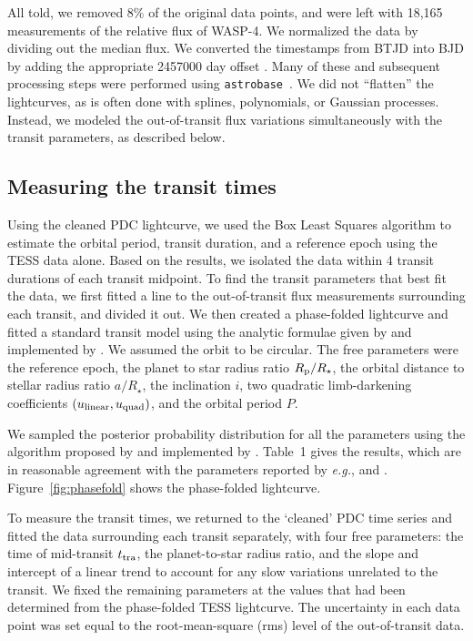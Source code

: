 \documentclass[12pt,twocolumn,tighten]{aastex62}
\begin{document}
All told, we removed 8\% of the original data points, and were left
with 18{,}165 measurements of the relative flux of WASP-4.  We
normalized the data by dividing out the median flux.  We converted the
timestamps from BTJD into BJD by adding the appropriate 2457000 day
offset \citep{tess_data_product_description_2018}.  Many of these and
subsequent processing steps were performed using
\texttt{astrobase}~\citep{bhatti_astrobase_2018}. We did not
``flatten'' the lightcurves, as is often done with splines,
polynomials, or Gaussian processes.  Instead, we modeled the
out-of-transit flux variations simultaneously with the transit parameters,
as described below.

\subsection{Measuring the transit times}
\label{sec:measurement}

Using the cleaned PDC lightcurve, we used the Box Least Squares
algorithm \citep{kovacs_box-fitting_2002} to estimate the orbital
period, transit duration, and a reference epoch using the TESS data
alone.  Based on the results, we isolated the data within 4 transit
durations of each transit midpoint.  To find the transit parameters
that best fit the data, we first fitted a line to the out-of-transit
flux measurements surrounding each transit, and divided it out.  We
then created a phase-folded lightcurve and fitted a standard transit
model using the analytic formulae given by
\citet{mandel_analytic_2002} and implemented by
\citet{kreidberg_batman_2015}.  We assumed the orbit to be circular.
The free parameters were the reference epoch, the planet to star
radius ratio $R_{\rm p}/R_\star$, the orbital distance to stellar
radius ratio $a/R_\star$, the inclination $i$, two quadratic
limb-darkening coefficients $(u_{\rm linear}, u_{\rm quad})$, and the
orbital period $P$.

We sampled the posterior probability distribution for all the
parameters using the algorithm proposed by
\citet{goodman_ensemble_2010} and implemented by
\citet{foreman-mackey_emcee_2013}.  Table~1 gives the results, which
are in reasonable agreement with the parameters reported by {\it
e.g.}, \citet{southworth_high-precision_2009} and
\citet{huitson_gemini_2017}.  Figure~\ref{fig:phasefold} shows the
phase-folded lightcurve.

To measure the transit times, we returned to the `cleaned' PDC time
series and fitted the data surrounding each transit separately, with
four free parameters: the time of mid-transit $t_{\rm tra}$, the
planet-to-star radius ratio, and the slope and intercept of a linear
trend to account for any slow variations unrelated to the transit.  We
fixed the remaining parameters at the values that had been determined
from the phase-folded TESS lightcurve.  The uncertainty in each data
point was set equal to the root-mean-square (rms) level of the
out-of-transit data.
\end{document}
